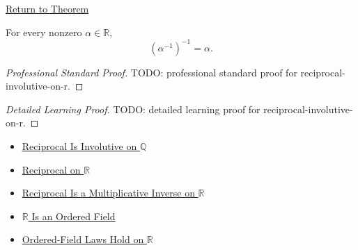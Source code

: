 \newpage
{}
\label{prf:reciprocal-involutive-on-r}

\begin{remark*}[Return]
\hyperref[thm:reciprocal-involutive-on-r]{Return to Theorem}
\end{remark*}

\begin{theorem*}
For every nonzero $\alpha\in\mathbb{R}$,
\[
(\alpha^{-1})^{-1}=\alpha.
\]
\end{theorem*}

\begin{proof}[Professional Standard Proof]
\LRAProofBodyStart
TODO: professional standard proof for reciprocal-involutive-on-r.
\end{proof}

\begin{proof}[Detailed Learning Proof]
\LRAProofBodyStart
TODO: detailed learning proof for reciprocal-involutive-on-r.
\end{proof}

\begin{remark*}
\end{remark*}

\begin{dependencies}
\begin{itemize}
  \item \hyperref[thm:reciprocal-involutive-on-q]{Reciprocal Is Involutive on $\mathbb{Q}$}
  \item \hyperref[def:reciprocal-on-r]{Reciprocal on $\mathbb{R}$}
  \item \hyperref[thm:reciprocal-multiplicative-inverse-on-r]{Reciprocal Is a Multiplicative Inverse on $\mathbb{R}$}
  \item \hyperref[thm:r-is-an-ordered-field]{$\mathbb{R}$ Is an Ordered Field}
  \item \hyperref[cor:ordered-field-laws-on-r]{Ordered-Field Laws Hold on $\mathbb{R}$}
\end{itemize}
\end{dependencies}

\clearpage
